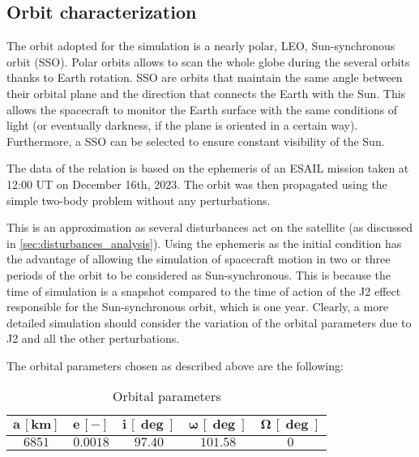 \subsection{Orbit characterization}
\label{subsec:orbit_characterization}

The orbit adopted for the simulation is a nearly polar, LEO, Sun-synchronous orbit (SSO). Polar orbits allows to scan the whole globe during the several orbits thanks to Earth rotation. SSO are orbits that maintain the same angle between their orbital plane and the direction that connects the Earth with the Sun.\cite{curtis_book} This allows the spacecraft to monitor the Earth surface with the same conditions of light (or eventually darkness, if the plane is oriented in a certain way). Furthermore, a SSO can be selected to ensure constant visibility of the Sun.\cite{esa_sso_site}

The data of the relation is based on the ephemeris of an ESAIL mission taken at 12:00 UT on December 16th, 2023. The orbit was then propagated using the simple two-body problem without any perturbations.

This is an approximation as several disturbances act on the satellite (as discussed in \autoref{sec:disturbances_analysis}). Using the ephemeris as the initial condition has the advantage of allowing the simulation of spacecraft motion in two or three periods of the orbit to be considered as Sun-synchronous. This is because the time of simulation is a snapshot compared to the time of action of the J2 effect responsible for the Sun-synchronous orbit, which is one year. Clearly, a more detailed simulation should consider the variation of the orbital parameters due to J2 and all the other perturbations.

The orbital parameters chosen as described above are the following:

\begin{table}[H]

    \centering
    \begin{tabular}{|c|c|c|c|c|}
    \hline
    $\bm{a \, [km]}$ & $\bm{e \, [-]}$ & $\bm{i \, [\deg]}$  & $\bm{\omega \, [\deg]}$   & $\bm{\Omega \, [\deg]}$ \\
    \hline
    $6851$ & $0.0018$ & $97.40$ & $101.58$ & $0$ \\
    \hline
    \end{tabular}
    
    \caption{Orbital parameters}
    \label{table:orb_table}
    
\end{table}

